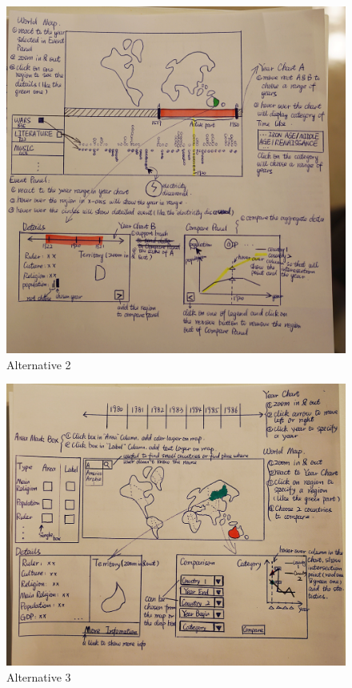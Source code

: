 \documentclass[12pt, fullpage,letterpaper]{article}
\begin{document}
\begin{figure}[h!]
    \begin{center}
        \includegraphics[width=\textwidth]{alternative2.JPG}
        \caption{Alternative 2}
        \label{fig:alt2}
    \end{center}
\end{figure}

\begin{figure}[h!]
    \begin{center}
        \includegraphics[width=\textwidth]{alternative3.JPG}
        \caption{Alternative 3}
        \label{fig:alt3}
    \end{center}
\end{figure}
\end{document}
